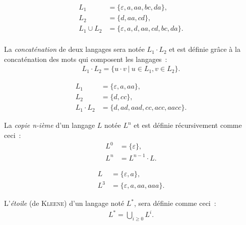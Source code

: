 \begin{example}
  \vspace{-\baselineskip}
  \begin{align*}
    L_1 &= \{\varepsilon, a, aa, bc, da\}, \\
    L_2 &= \{d, aa, cd\}, \\
    L_1 \cup L_2 &= \{\varepsilon, a, d, aa, cd, bc, da\}. \\
  \end{align*}
\end{example}

\begin{definition}
  La \textit{concaténation} de deux langages sera notée \(L_1 \cdot L_2\) et
  est définie grâce à la concaténation des mots qui composent les langages~:
  \begin{gather*}
    L_1 \cdot L_2 = \{u \cdot v ~|~ u \in L_1, v \in L_2\}.
  \end{gather*}
\end{definition}

\begin{example}
  \vspace{-\baselineskip}
  \begin{align*}
    L_1 &= \{\varepsilon, a, aa\}, \\
    L_2 &= \{d, cc\}, \\
    L_1 \cdot L_2 &= \{d, ad, aad, cc, acc, aacc\}.
  \end{align*}
\end{example}

\begin{definition}
  La \textit{copie n-ième} d'un langage \(L\) notée \(L^n\) et est définie
  récursivement comme ceci~:
  \begin{align*}
    L^0 &= \{\varepsilon\}, \\
    L^n &= L^{n - 1} \cdot L.
  \end{align*}
\end{definition}

\begin{example}
  \vspace{-\baselineskip}
  \begin{align*}
    L &= \{\varepsilon, a\}, \\
    L^3 &= \{\varepsilon, a, aa, aaa\}.
  \end{align*}
\end{example}

\begin{definition}
  L'\textit{étoile} (de \textsc{Kleene}) d'un langage noté \(L^*\), sera
  définie comme ceci~:
  \begin{gather*}
    L^* = \bigcup_{i \geq 0} L^i.
  \end{gather*}
\end{definition}

